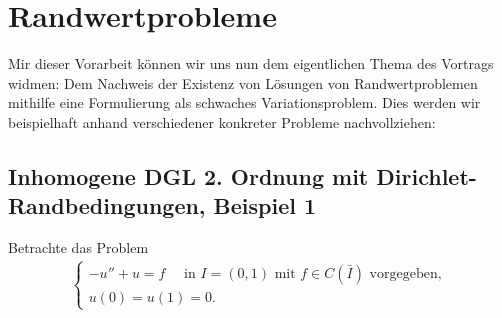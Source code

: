 \documentclass[twoside]{article}
\theoremstyle{definition}
\begin{document}
\section{Randwertprobleme}
Mir dieser Vorarbeit können wir uns nun dem eigentlichen Thema des Vortrags widmen: Dem Nachweis der Existenz von Lösungen von Randwertproblemen mithilfe eine Formulierung als schwaches Variationsproblem. Dies werden wir beispielhaft anhand verschiedener konkreter Probleme nachvollziehen: 
\subsection{Inhomogene DGL 2. Ordnung mit Dirichlet-Randbedingungen, Beispiel 1}
Betrachte das Problem
\begin{align}
\begin{cases}
-u'' + u = f \quad \text{ in } I = (0,1) \text{ mit } f \in C(\bar{I}) \text{ vorgegeben},\\ 
u(0)=u(1)=0.
\end{cases} \label{bsp:bsp1stark}
\end{align}
\end{document}
